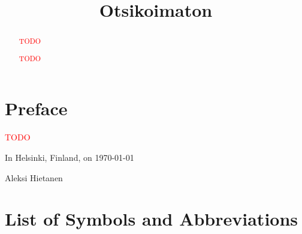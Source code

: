 \begin{abstract}

\textcolor{red}{TODO}

\end{abstract}

\begin{otherlanguage}{finnish}

\title{Otsikoimaton}
\examiner{}
\keywords{}

\begin{abstract}

\textcolor{red}{TODO}

\end{abstract}
\end{otherlanguage}

\chapter*{Preface}

\textcolor{red}{TODO}

\vspace{2\baselineskip}

In Helsinki, Finland, on \today

\vspace{2\baselineskip}

Aleksi Hietanen

\tableofcontents
\listoffigures
\listoftables
\chapter*{List of Symbols and Abbreviations}


